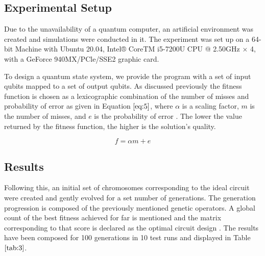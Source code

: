 \documentclass[conference]{IEEEtran}
\begin{document}
\subsection{Experimental Setup}
Due to the unavailability of a quantum computer, an artificial environment was created and simulations were conducted in it. The experiment was set up on a 64-bit Machine with Ubuntu 20.04, Intel® CoreTM i5-7200U CPU @ 2.50GHz × 4, with a GeForce 940MX/PCle/SSE2 graphic card. 

To design a quantum state system, we provide the program with a set of input qubits mapped to a set of output qubits. As discussed previously the fitness function is chosen as a lexicographic combination of the number of misses and probability of error as given in Equation $\ref{eq:5}$, where $\alpha$ is a scaling factor, $\textit{m}$ is the number of misses, and $\textit{e}$ is the probability of error \cite{lex}. The lower the value returned by the fitness function, the higher is the solution's quality.

\begin{equation}
\label{eq:5}
f = \alpha m + e
\end{equation}


\subsection{Results}
Following this, an initial set of chromosomes corresponding to the ideal circuit were created and gently evolved for a set number of generations. The generation progression is composed of the previously mentioned genetic operators. A global count of the best fitness achieved for far is mentioned and the matrix corresponding to that score is declared as the optimal circuit design \cite{cir}. The results have been composed for 100 generations in 10 test runs and displayed in Table $\ref{tab:3}$.  
\end{document}
